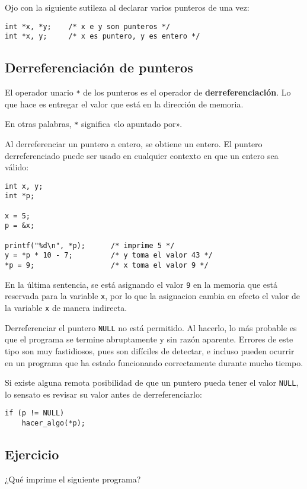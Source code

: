 Ojo con la siguiente sutileza al declarar varios punteros de una vez:

\begin{lstlisting}
int *x, *y;    /* x e y son punteros */
int *x, y;     /* x es puntero, y es entero */
\end{lstlisting}

\subsection{Derreferenciación de punteros}

El operador unario \lstinline!*! de los punteros es el operador de
\textbf{derreferenciación}. Lo que hace es entregar el valor que está en
la dirección de memoria.

En otras palabras, \lstinline!*! significa «lo apuntado por».

Al derreferenciar un puntero a entero, se obtiene un entero. El puntero
derreferenciado puede ser usado en cualquier contexto en que un entero
sea válido:

\begin{lstlisting}
int x, y;
int *p;

x = 5;
p = &x;

printf("%d\n", *p);      /* imprime 5 */
y = *p * 10 - 7;         /* y toma el valor 43 */
*p = 9;                  /* x toma el valor 9 */
\end{lstlisting}

En la última sentencia, se está asignando el valor \lstinline!9! en la
memoria que está reservada para la variable \lstinline!x!, por lo que la
asignacion cambia en efecto el valor de la variable \lstinline!x! de
manera indirecta.

Derreferenciar el puntero \lstinline!NULL! no está permitido. Al
hacerlo, lo más probable es que el programa se termine abruptamente y
sin razón aparente. Errores de este tipo son muy fastidiosos, pues son
difíciles de detectar, e incluso pueden ocurrir en un programa que ha
estado funcionando correctamente durante mucho tiempo.

Si existe alguna remota posibilidad de que un puntero pueda tener el
valor \lstinline!NULL!, lo sensato es revisar su valor antes de
derreferenciarlo:

\begin{lstlisting}
if (p != NULL)
    hacer_algo(*p);
\end{lstlisting}

\subsection{Ejercicio}

¿Qué imprime el siguiente programa?

